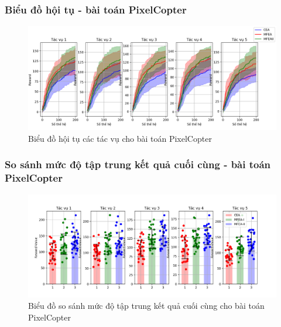 \subsubsection{Biểu đồ hội tụ - bài toán PixelCopter}
\begin{figure}[h!]
    \centering
    \includegraphics[width=\textwidth,height=\textheight,keepaspectratio]{thesis/images/results/rl/pixcelcopter_conv.png}
    \caption{Biểu đồ hội tụ các tác vụ cho bài toán PixelCopter}
    \label{fig:PixelCopter_conv}
\end{figure}

\subsubsection{So sánh mức độ tập trung kết quả cuối cùng - bài toán PixelCopter}
\begin{figure}[h!]
    \centering
    \includegraphics[width=\textwidth,height=\textheight,keepaspectratio]{thesis/images/results/rl/pixelcopter_final.png}
    \caption{Biểu đồ so sánh mức độ tập trung kết quả cuối cùng cho bài toán PixelCopter}
    \label{fig:PixelCopter}
\end{figure}
